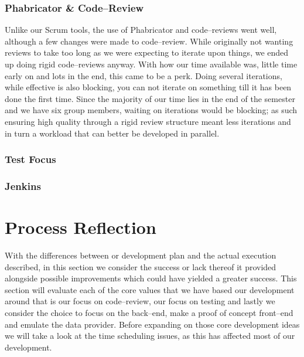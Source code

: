 \subsubsection{Phabricator \& Code--Review}
Unlike our Scrum tools, the use of Phabricator and code--reviews went well, although a few changes were made to code--review.
While originally not wanting reviews to take too long as we were expecting to iterate upon things, we ended up doing rigid code--reviews anyway.
With how our time available was, little time early on and lots in the end, this came to be a perk.
Doing several iterations, while effective is also blocking, you can not iterate on something till it has been done the first time.
Since the majority of our time lies in the end of the semester and we have six group members, waiting on iterations would be blocking; as such ensuring high quality through a rigid review structure meant less iterations and in turn a workload that can better be developed in parallel.
\subsubsection{Test Focus}
\subsubsection{Jenkins}
\section{Process Reflection}
With the differences between or development plan and the actual execution described, in this section we consider the success or lack thereof it provided alongside possible improvements which could have yielded a greater success.
This section will evaluate each of the core values that we have based our development around that is our focus on code--review, our focus on testing and lastly we consider the choice to focus on the back--end, make a proof of concept front--end and emulate the data provider.
Before expanding on those core development ideas we will take a look at the time scheduling issues, as this has affected most of our development.
